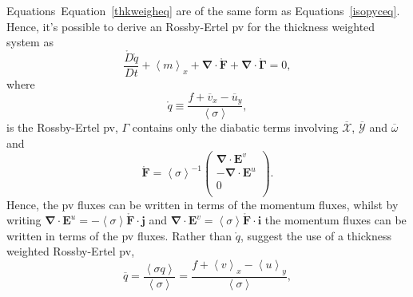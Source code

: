 \documentclass[10pt,a4paper]{article}
\newcommand*\thkmean[1]{\overline{#1}}
\newcommand*\nthkmean[1]{\left\langle{#1}\right\rangle}
\newcommand*\spec[1]{\mathring{#1}}
\newcommand*\equref[1]{Equation~\ref{#1}}
\begin{document}
                      Equations~\equref{thkweigheq} are of the same form as Equations~\ref{isopyceq}.
                      Hence, it's possible to derive an
                      Rossby-Ertel \gls{pv} for the thickness weighted system
                      as
                      \begin{equation}
                      \frac{\spec{D} \spec{q}}{D t} + \nthkmean{m}_{x} 
                      +\boldsymbol{\nabla}\cdot\spec{\boldsymbol{F}}
                      +\boldsymbol{\nabla}\cdot\spec{\boldsymbol{\Gamma}}=0,
                      \end{equation} 
                      where
                      \begin{equation}
                      \spec{q}\equiv\frac{f+\thkmean{v}_{x}-\thkmean{u}_{y}}{\nthkmean{\sigma}},
                      \end{equation}
                      is the Rossby-Ertel \gls{pv}, $\Gamma$ contains only the diabatic terms involving $\thkmean{\mathcal{X}} $, $\thkmean{\mathcal{Y}} $ and $\thkmean{\omega} $ and 
                      \begin{equation}
                      \spec{\boldsymbol{F}}=\nthkmean{\sigma}^{-1}\left(
                      \begin{array}{c}
                      \boldsymbol{\nabla}\cdot\boldsymbol{E}^v \\
                      -\boldsymbol{\nabla}\cdot\boldsymbol{E}^u\\
                      0 \\
                      \end{array}\right).
                      \end{equation}
                      Hence, the \gls{pv} fluxes can be written in terms of
                      the momentum fluxes, whilst by writing ${\boldsymbol{\nabla}\cdot\boldsymbol{E}^u = -\nthkmean{\sigma} \spec{\boldsymbol{F}}\cdot\boldsymbol{j}}$ and
                      ${\boldsymbol{\nabla}\cdot\boldsymbol{E}^v = \nthkmean{\sigma} \spec{\boldsymbol{F}}\cdot\boldsymbol{i}}$ the momentum fluxes
                      can be written in terms of the \gls{pv} fluxes.
                      Rather than $\spec{q}$, \cite{greatbatch1998exploring} suggest
                      the use of a thickness weighted Rossby-Ertel \gls{pv},
                      \begin{equation}
                      \thkmean{q}=\frac{\nthkmean{\sigma q}}{\nthkmean{\sigma}}=\frac{f+\nthkmean{v}_{x}-\nthkmean{u}_{y}}{\nthkmean{\sigma}},
                      \end{equation}
\end{document}
